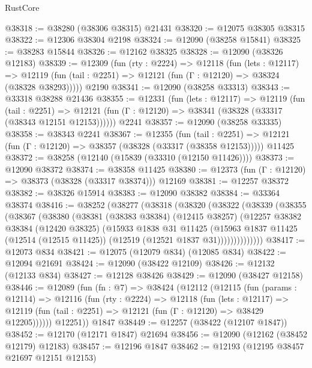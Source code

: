 \begin{lexlean}{RustCore}
\begin{coremodule}
@38318 := @38280 (@38306 @38315) @21431
@38320 := @12075 @38305 @38315
@38322 := @12306 @38304 @2198
@38324 := @12090 (@38258 @15841)
@38325 := @38283 @15844
@38326 := @12162 @38325
@38328 := @12090 (@38326 @12183)
@38339 := @12309
    (fun (rty : @2224) =>
    @12118
      (fun (lets : @12117) =>
      @12119 (fun (tail : @2251) => @12121 (fun (Γ : @12120) => @38324 (@38328 @38293)))))
    @2190
@38341 := @12090 (@38258 @33313)
@38343 := @33318 @38288 @21436
@38355 := @12331
    (fun (lets : @12117) =>
    @12119
      (fun (tail : @2251) =>
      @12121 (fun (Γ : @12120) => @38341 (@38328 (@33317 (@38343 @12151 @12153))))))
    @2241
@38357 := @12090 (@38258 @33335)
@38358 := @38343 @2241
@38367 := @12355
    (fun (tail : @2251) => @12121 (fun (Γ : @12120) => @38357 (@38328 (@33317 (@38358 @12153)))))
    @11425
@38372 := @38258 (@12140 (@15839 (@33310 (@12150 @11426))))
@38373 := @12090 @38372
@38374 := @38358 @11425
@38380 := @12373 (fun (Γ : @12120) => @38373 (@38328 (@33317 @38374))) @12169
@38381 := @12257 @38372
@38382 := @38326 @15914
@38383 := @12090 @38382
@38384 := @33364 @38374
@38416 := @38252
    (@38277
      (@38318
        (@38320
          (@38322
            (@38339
              (@38355
                (@38367
                  (@38380
                    (@38381
                      (@38383 @38384)
                      (@12415 @38257)
                      (@12257
                        @38382
                        @38384
                        (@12420 @38325)
                        (@15933
                          @1838
                          @31
                          @11425
                          (@15963
                            @1837
                            @11425
                            (@12514 (@12515 @11425))
                            (@12519 (@12521 @1837 @31))))))))))))))
@38417 := @12073 @834
@38421 := @12075 (@12079 @834) (@12085 @834)
@38422 := @12094 @21691
@38424 := @12090 (@38422 @12109)
@38426 := @12132 (@12133 @834)
@38427 := @12128 @38426
@38429 := @12090 (@38427 @12158)
@38446 := @12089
    (fun (fn : @7) =>
    @38424
      (@12112
        (@12115
          (fun (params : @12114) =>
          @12116
            (fun (rty : @2224) =>
            @12118
              (fun (lets : @12117) =>
              @12119 (fun (tail : @2251) => @12121 (fun (Γ : @12120) => @38429 @12205))))))
        @12251))
    @1847
@38449 := @12257 (@38422 (@12107 @1847))
@38452 := @12170 (@12171 @1847) @21694
@38456 := @12090 (@12162 (@38452 @12179) @12183)
@38457 := @12196 @1847
@38462 := @12193 (@12195 @38457 @21697 @12151 @12153)

\end{coremodule}
\end{lexlean}

